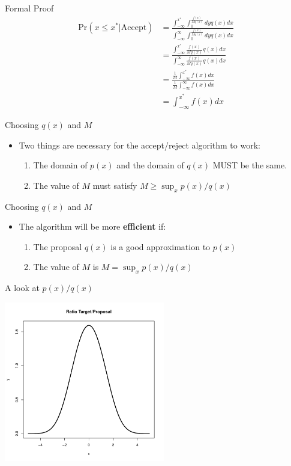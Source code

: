 \documentclass
[handout]
{beamer}
\begin{document}
\begin{frame}{Formal Proof}
\begin{align*}
\mbox{Pr}(x\leq x^*|\mbox{Accept})&=\frac{\int_{-\infty}^{x^*}\int_{0}^{\frac{f(x)}{Mq(x)}}dyq(x)dx}{\int_{-\infty}^{\infty}\int_{0}^{\frac{f(x)}{Mq(x)}}dyq(x)dx}\\
&=\frac{\int_{-\infty}^{x^*}\frac{f(x)}{Mq(x)}q(x)dx}{\int_{-\infty}^{\infty}\frac{f(x)}{Mq(x)}q(x)dx}\\
&=\frac{\frac{1}{M}\int_{-\infty}^{x^*}f(x)dx}{\frac{1}{M}\int_{-\infty}^{\infty}f(x)dx}\\
&=\int_{-\infty}^{x^*}f(x)dx
\end{align*}
\end{frame}
\begin{frame}{Choosing $q(x)$ and $M$}
\begin{itemize}
\item Two things are necessary for the accept/reject algorithm to work:
\pause
\begin{enumerate}
\item The domain of $p(x)$ and the domain of $q(x)$ MUST be the same.  
\item The value of $M$ must satisfy $M\geq \sup_x p(x)/q(x)$
\end{enumerate}
\end{itemize}
\end{frame}
\begin{frame}{Choosing $q(x)$ and $M$}
\begin{itemize}
\item The algorithm will be more {\bf efficient} if:
\pause
\begin{enumerate}
\item The proposal $q(x)$ is a good approximation to $p(x)$ 
\item The value of $M$ is $M=\sup_x p(x)/q(x)$
\end{enumerate}
\end{itemize}
\end{frame}
\begin{frame}{A look at $p(x)/q(x)$}
\begin{center}
\includegraphics[height=7cm]{./Pics/rat1.pdf}
\end{center}
\end{frame}
\end{document}

